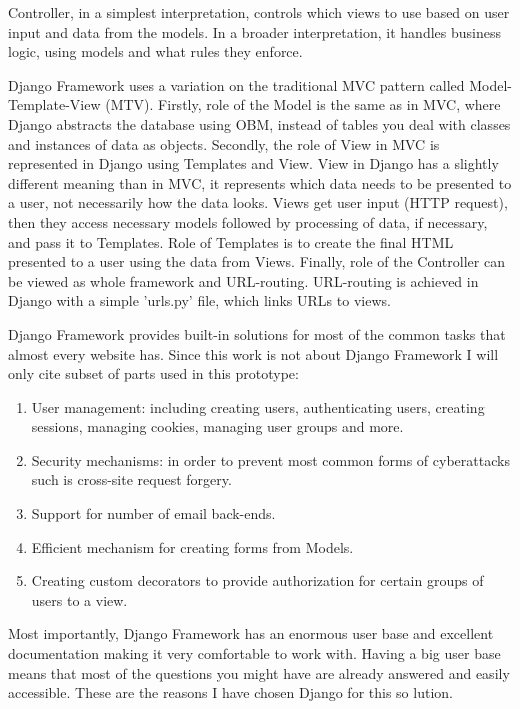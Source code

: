 Controller, in a simplest interpretation, controls which views to use based on user input and data from the models. In a broader interpretation, it handles business logic, using models and what rules they enforce.

Django Framework uses a variation on the traditional MVC pattern called Model-Template-View (MTV). Firstly, role of the Model is the same as in MVC, where Django abstracts the database using OBM, instead of tables you deal with classes and instances of data as objects. Secondly, the role of View in MVC is represented in Django using Templates and View. View in Django has a slightly different meaning than in MVC, it represents which data needs to be presented to a user, not necessarily how the data looks. Views get user input (HTTP request), then they access necessary models followed by processing of data, if necessary, and pass it to Templates. Role of Templates is to create the final HTML presented to a user using the data from Views. Finally, role of the Controller can be viewed as whole framework and URL-routing. URL-routing is achieved in Django with a simple 'urls.py' file, which links URLs to views.

Django Framework provides built-in solutions for most of the common tasks that almost every website has. Since this work is not about Django Framework I will only cite subset of parts used in this prototype:

\begin{enumerate}
	\setlength{\itemsep}{1pt}
	\item User management: including creating users, authenticating users, creating sessions, managing cookies, managing user groups and more.
	\item Security mechanisms: in order to prevent most common forms of cyberattacks such is cross-site request forgery.
	\item Support for number of email back-ends.
	\item Efficient mechanism for creating forms from Models.
	\item Creating custom decorators to provide authorization for certain groups of users to a view.
\end{enumerate}

Most importantly, Django Framework has an enormous user base and excellent documentation making it very comfortable to work with. Having a big user base means that most of the questions you might have are already answered and easily accessible. These are the reasons I have chosen Django for this so lution.

